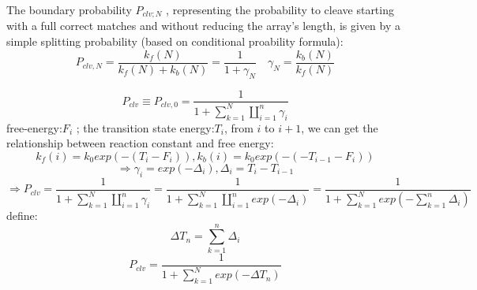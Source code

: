 \documentclass[a4paper,10pt]{article}
\begin{document}
	The boundary probability $P_{clv;N}$ , representing the probability to cleave starting with a full correct matches and without reducing the array’s length, is given by a simple splitting probability (based on conditional proability formula):
	\begin{equation}
	P_{clv,N}=\frac{k_f(N)}{k_f(N)+k_b(N)}=\frac{1}{1+\gamma_N} \quad \gamma_N=\frac{k_b(N)}{k_f(N)}
	\end{equation}
	
	\begin{equation}
	P_{clv} \equiv P_{clv,0} = \frac{1}{1+\sum_{k=1}^N\coprod_{i=1}^n \gamma_i}
	\end{equation}
	free-energy:$F_i$ ; the transition state energy:$T_i$, from $i$ to $i+1$, we can get the relationship between reaction constant and free energy:
	\begin{equation}
	k_f(i)=k_0exp(-(T_i-F_i)),k_b(i)=k_0exp(-(-T_{i-1}-F_i))
	\end{equation}
	\begin{equation}
	\Rightarrow \gamma_i=exp(-\Delta_i),\Delta_i=T_i-T_{i-1}
	\end{equation}
	\begin{equation}
	\Rightarrow P_{clv} = \frac{1}{1+\sum_{k=1}^N\coprod_{i=1}^n \gamma_i}=\frac{1}{1+\sum_{k=1}^N\coprod_{i=1}^n exp(-\Delta_i)}=\frac{1}{1+\sum_{k=1}^N exp(-\sum_{k=1}^n\Delta_i)}
	\end{equation}
	define: $$\Delta T_n=\sum_{k=1}^n\Delta_i$$
	\begin{equation} P_{clv} =\frac{1}{1+\sum_{k=1}^N exp(-\Delta T_n)}
	\end{equation}
	
\end{document}
